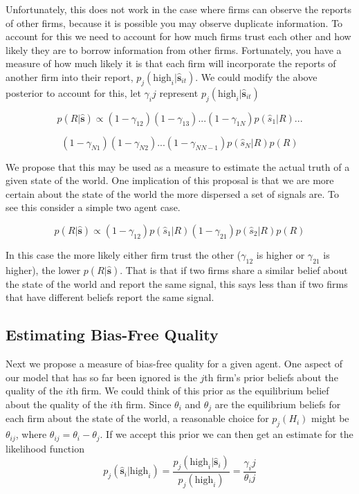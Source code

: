 \documentclass[a4paper]{article}
\begin{document}
 Unfortunately, this does not work in the case where firms can observe the reports of other firms, because it is possible you may observe duplicate information.  To account for this we need to account for how much firms trust each other and how likely they are to borrow information from other firms.  Fortunately, you have a measure of how much likely it is that each firm will incorporate the reports of another firm into their report, $p_j(\text{high}_i|\hat{\textbf{s}}_{it})$.  We could modify the above posterior to account for this, let $\gamma_ij$ represent $p_j(\text{high}_i|\hat{\textbf{s}}_{it})$
 
 \[p(R|\hat{\textbf{s}}) \propto (1-\gamma_{12})(1-\gamma_{13})...(1-\gamma_{1N})p(\hat{s}_1|R)...\]
 
 \[(1-\gamma_{N1})(1-\gamma_{N2})...(1-\gamma_{NN-1})p(\hat{s}_N|R)p(R)\]
 
 We propose that this may be used as a measure to estimate the actual truth of a given state of the world.
  One implication of this proposal is that we are more certain about the state of the world the more dispersed a set of signals are.  To see this consider a simple two agent case.

\[p(R|\hat{\textbf{s}}) \propto (1-\gamma_{12})p(\hat{s}_1|R)(1-\gamma_{21})p(\hat{s}_2|R)p(R)\]

In this case the more likely either firm trust the other ($\gamma_{12}$ is higher or $\gamma_{21}$ is higher), the lower $p(R|\hat{\textbf{s}})$.  That is that if two firms share a similar belief about the state of the world and report the same signal, this says less than if two firms that have different beliefs report the same signal.

\subsection{Estimating Bias-Free Quality}

Next we propose a measure of bias-free quality for a given agent.  One aspect of our model that has so far been ignored is the $j$th firm's prior beliefs about the quality of the $i$th firm. We could think of this prior as the equilibrium belief about the quality of the $i$th firm.  Since $\theta_i$ and $\theta_j$ are the equilibrium beliefs for each firm about the state of the world, a reasonable choice for $p_j(H_i)$ might be $\theta_{ij}$, where $\theta_{ij} = \theta_i - \theta_j$.
If we accept this prior we can then get an estimate for the likelihood function 
\[p_j(\hat{\textbf{s}}_i|\text{high}_i) = \frac{p_j(\text{high}_i|\hat{\textbf{s}}_i)}{p_j(\text{high}_i)} = \frac{\gamma_ij}{\theta_ij}\]
\end{document}

